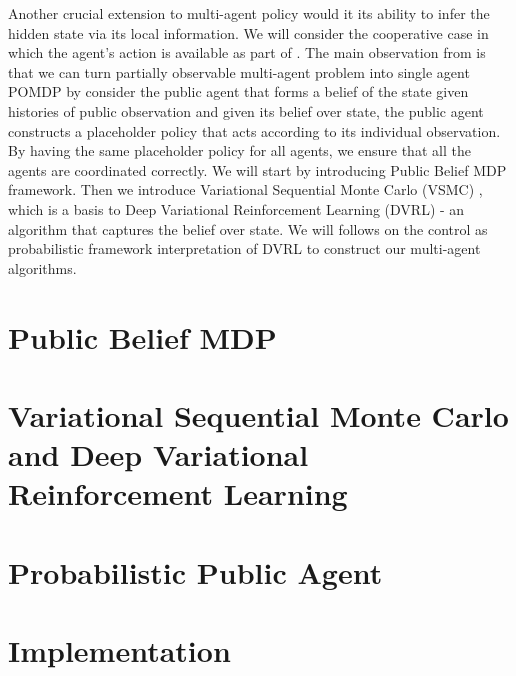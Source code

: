 \label{chapter:chap9}
\begin{miniabstract}
Another crucial extension to multi-agent policy would it its ability to infer the hidden state via its local information. We will consider the cooperative case in which the agent's action is available as part of . The main observation from \cite{nayyar2013decentralized, foerster2018bayesian} is that we can turn partially observable multi-agent problem into single agent POMDP by consider the public agent that forms a belief of the state given histories of public observation and given its belief over state, the public agent constructs a placeholder policy that acts according to its individual observation. By having the same placeholder policy for all agents, we ensure that all the agents are coordinated correctly. We will start by introducing Public Belief MDP framework. Then we introduce Variational Sequential Monte Carlo (VSMC) \cite{le2017auto, maddison2017filtering, naesseth2017variational}, which is a basis to Deep Variational Reinforcement Learning (DVRL) \cite{igl2018deep} - an algorithm that captures the belief over state. We will follows \cite{shvechikovjoint} on the control as probabilistic framework interpretation of DVRL to construct our multi-agent algorithms.
\end{miniabstract}

\section{Public Belief MDP}


\section{Variational Sequential Monte Carlo and Deep Variational Reinforcement Learning}


\section{Probabilistic Public Agent}


\section{Implementation}

